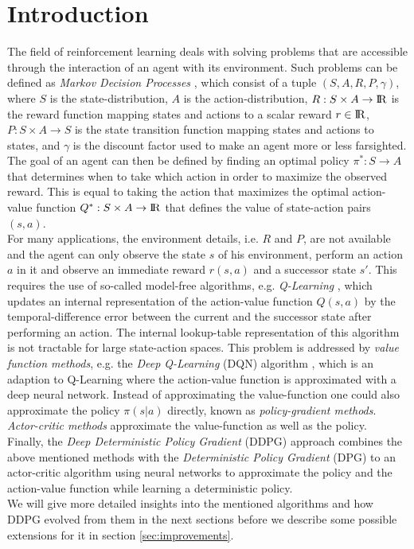 \section{Introduction}
\label{sec:intro}
The field of reinforcement learning deals with solving problems that are accessible through the interaction of an agent with its environment. Such problems can be defined as \textit{Markov Decision Processes} \citep{howard1960dynamic}, which consist of a tuple $(S, A, R, P, \gamma)$, where $S$ is the state-distribution, $A$ is the action-distribution, $R:S\times A\rightarrow {\rm I\!R}$ is the reward function mapping states and actions to a scalar reward $r\in{\rm I\!R}$, $P:S\times  A \rightarrow S$ is the state transition function mapping states and actions to states, and $\gamma$ is the discount factor used to make an agent more or less farsighted. The goal of an agent can then be defined by finding an optimal policy $\pi^*:S\rightarrow A$ that determines when to take which action in order to maximize the observed reward. This is equal to taking the action that maximizes the optimal action-value function $Q^*:S \times A \rightarrow {\rm I\!R}$ that defines the value of state-action pairs $(s, a)$.\\ 
For many applications, the environment details, i.e. $R$ and $P$, are not available and the agent can only observe the state $s$ of his environment, perform an action $a$ in it and observe an immediate reward $r(s,a)$ and a successor state $s'$. This requires the use of so-called model-free algorithms, e.g. \textit{Q-Learning} \citep{watkins1992q}, which updates an internal representation of the action-value function $Q(s,a)$ by the temporal-difference error between the current and the successor state after performing an action. The internal lookup-table representation of this algorithm is not tractable for large state-action spaces. This problem is addressed by \textit{value function methods}, e.g. the \textit{Deep Q-Learning} (DQN) algorithm \citep{mnih2013playing}, which is an adaption to Q-Learning where the action-value function is approximated with a deep neural network. Instead of approximating the value-function one could also approximate the policy $\pi(s|a)$ directly, known as \textit{policy-gradient methods}. \textit{Actor-critic methods} \citep{konda2000actor} approximate the value-function as well as the policy.\\
Finally, the \textit{Deep Deterministic Policy Gradient} (DDPG) approach \citep{lillicrap2015continuous} combines the above mentioned methods with the \textit{Deterministic Policy Gradient} (DPG) \citep{silver2014deterministic} to an actor-critic algorithm using neural networks to approximate the policy and the action-value function while learning a deterministic policy.\\
We will give more detailed insights into the mentioned algorithms and how DDPG evolved from them in the next sections before we describe some possible extensions for it in section \ref{sec:improvements}.

